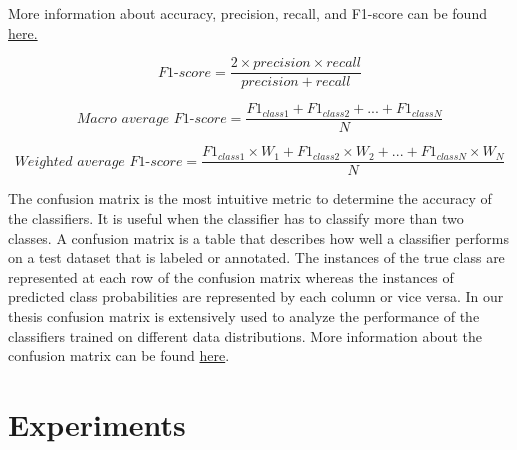More information about accuracy, precision, recall, and F1-score can be found \href{https://en.wikipedia.org/wiki/Precision_and_recall}{here\footnotemark.}


\begin{equation}\label{f1-score}
\textit{F1-score} = \frac{2 \times precision \times recall}{precision + recall}
\end{equation}


\begin{equation}\label{macrof1-score} 
\textit{Macro average F1-score} =  \frac{F1_{class1} + F1_{class2}+ ... + F1_{classN}}{N}
\end{equation}


\begin{equation}\label{Weightedf1-score} 
\textit{Weighted average F1-score} =  \frac{F1_{class1} \times W_1 + F1_{class2} \times W_2 + ... + F1_{classN} \times W_N}{N}
\end{equation}



The confusion matrix is the most intuitive metric to determine the accuracy of the classifiers. It is useful when the classifier has to classify more than two classes. A confusion matrix is a table that describes how well a classifier performs on a test dataset that is labeled or annotated. The instances of the true class are represented at each row of the confusion matrix whereas the instances of predicted class probabilities are represented by each column or vice versa. In our thesis confusion matrix is extensively used to analyze the performance of the classifiers trained on different data distributions. More information about the confusion matrix can be found \href{https://en.wikipedia.org/wiki/Confusion_matrix}{here}\footnotemark.


\section{Experiments}\label{experiments}


